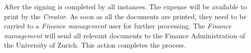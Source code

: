 After the signing is completed by all instances. The expense will be available to print by the \textit{Creator}. As soon as all the documents are printed, they need to be carried to a \textit{Finance management} user for further processing. The \textit{Finance management} will send all relevant documents to the Finance Administration of the University of Zurich. This action completes the process.
